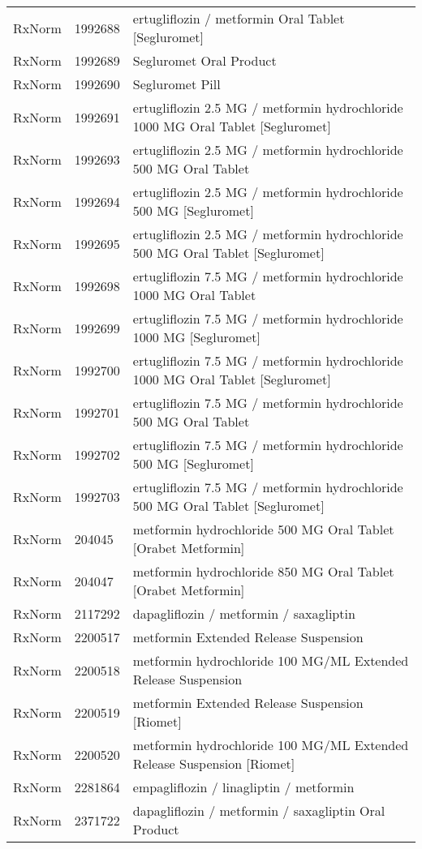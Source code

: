 \begin{longtable}{p{}p{}p{}}
  RxNorm & 1992688 & ertugliflozin / metformin Oral Tablet [Segluromet] \\ 
  RxNorm & 1992689 & Segluromet Oral Product \\ 
  RxNorm & 1992690 & Segluromet Pill \\ 
  RxNorm & 1992691 & ertugliflozin 2.5 MG / metformin hydrochloride 1000 MG Oral Tablet [Segluromet] \\ 
  RxNorm & 1992693 & ertugliflozin 2.5 MG / metformin hydrochloride 500 MG Oral Tablet \\ 
  RxNorm & 1992694 & ertugliflozin 2.5 MG / metformin hydrochloride 500 MG [Segluromet] \\ 
  RxNorm & 1992695 & ertugliflozin 2.5 MG / metformin hydrochloride 500 MG Oral Tablet [Segluromet] \\ 
  RxNorm & 1992698 & ertugliflozin 7.5 MG / metformin hydrochloride 1000 MG Oral Tablet \\ 
  RxNorm & 1992699 & ertugliflozin 7.5 MG / metformin hydrochloride 1000 MG [Segluromet] \\ 
  RxNorm & 1992700 & ertugliflozin 7.5 MG / metformin hydrochloride 1000 MG Oral Tablet [Segluromet] \\ 
  RxNorm & 1992701 & ertugliflozin 7.5 MG / metformin hydrochloride 500 MG Oral Tablet \\ 
  RxNorm & 1992702 & ertugliflozin 7.5 MG / metformin hydrochloride 500 MG [Segluromet] \\ 
  RxNorm & 1992703 & ertugliflozin 7.5 MG / metformin hydrochloride 500 MG Oral Tablet [Segluromet] \\ 
  RxNorm & 204045 & metformin hydrochloride 500 MG Oral Tablet [Orabet Metformin] \\ 
  RxNorm & 204047 & metformin hydrochloride 850 MG Oral Tablet [Orabet Metformin] \\ 
  RxNorm & 2117292 & dapagliflozin / metformin / saxagliptin \\ 
  RxNorm & 2200517 & metformin Extended Release Suspension \\ 
  RxNorm & 2200518 & metformin hydrochloride 100 MG/ML Extended Release Suspension \\ 
  RxNorm & 2200519 & metformin Extended Release Suspension [Riomet] \\ 
  RxNorm & 2200520 & metformin hydrochloride 100 MG/ML Extended Release Suspension [Riomet] \\ 
  RxNorm & 2281864 & empagliflozin / linagliptin / metformin \\ 
  RxNorm & 2371722 & dapagliflozin / metformin / saxagliptin Oral Product \\ 

\end{longtable}
